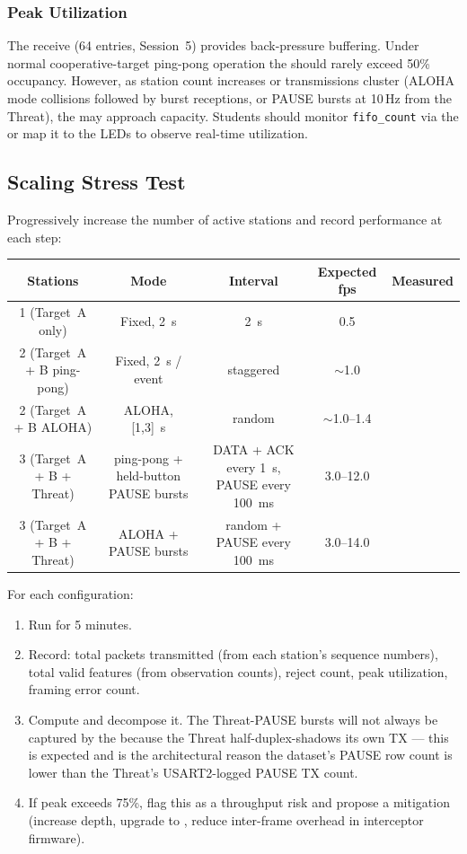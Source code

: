 \documentclass[11pt,letterpaper]{article}
\begin{document}
	\subsubsection{\FIFO{} Peak Utilization}

	The receive \FIFO{} (64 entries, Session~5) provides back-pressure buffering. Under normal cooperative-target ping-pong operation the \FIFO{} should rarely exceed 50\% occupancy. However, as station count increases or transmissions cluster (ALOHA mode collisions followed by burst receptions, or PAUSE bursts at 10\,Hz from the Threat), the \FIFO{} may approach capacity. Students should monitor \texttt{fifo\_count} via the \ILA{} or map it to the LEDs to observe real-time utilization.

	\subsection{Scaling Stress Test}

	\begin{tcolorbox}[infobox={Exercise: Beacon Count Scaling}]
		Progressively increase the number of active stations and record performance at each step:

		\medskip
		\begin{tabular}{c c c c c}
			\toprule
			\textbf{Stations} & \textbf{Mode} & \textbf{Interval} & \textbf{Expected fps} & \textbf{Measured \PER{}} \\
			\midrule
			1 (Target~A only) & Fixed, 2~s & 2~s & 0.5 & \\
			2 (Target~A + B ping-pong) & Fixed, 2~s / event & staggered & $\sim$1.0 & \\
			2 (Target~A + B ALOHA) & ALOHA, [1,3]~s & random & $\sim$1.0--1.4 & \\
			3 (Target~A + B + Threat) & ping-pong + held-button PAUSE bursts & DATA + ACK every 1~s, PAUSE every 100~ms & 3.0--12.0 & \\
			3 (Target~A + B + Threat) & ALOHA + PAUSE bursts & random + PAUSE every 100~ms & 3.0--14.0 & \\
			\bottomrule
		\end{tabular}

		\medskip
		For each configuration:
		\begin{enumerate}
			\item Run for 5 minutes.
			\item Record: total packets transmitted (from each station's sequence numbers), total valid features (from \FPGA{} observation counts), \CRC{} reject count, \FIFO{} peak utilization, framing error count.
			\item Compute \PER{} and decompose it. The Threat-PAUSE bursts will not always be captured by the \FPGA{} because the Threat half-duplex-shadows its own TX --- this is expected and is the architectural reason the dataset's PAUSE row count is lower than the Threat's USART2-logged PAUSE TX count.
			\item If \FIFO{} peak exceeds 75\%, flag this as a throughput risk and propose a mitigation (increase \FIFO{} depth, upgrade to \SPI{}, reduce inter-frame overhead in interceptor firmware).
		\end{enumerate}
	\end{tcolorbox}
\end{document}
